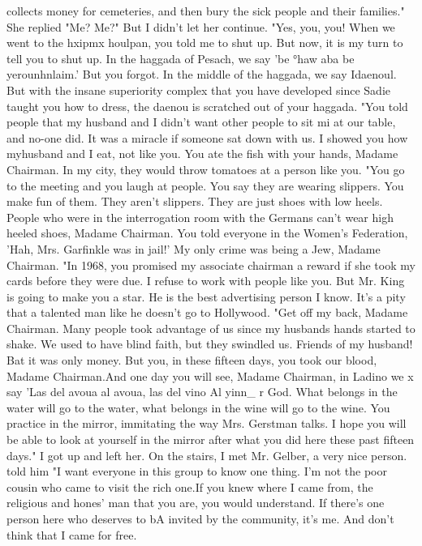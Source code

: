 {collects money for cemeteries, and then bury the sick people and their families."
She replied "Me?
Me?"
But I didn't let her continue.
"Yes, you, you!
When we went to the hxipmx houlpan, you told me to shut up.
But 
now, it is my turn to tell you to shut up.
In the haggada of Pesach, we say 'be 
°haw aba be yerounhnlaim.'
But you forgot.
In the middle of the haggada, we say 
Idaenoul.
But with the insane superiority complex that you have developed since Sadie 
taught you how to dress, the daenou is scratched out of your haggada.
"You told people that my husband and I didn't want other people to sit mi at our 
table, and no-one did.
It was a miracle if someone sat down with us.
I showed you 
how myhusband and I eat, not like you.
You ate the fish with your hands, Madame 
Chairman.
In my city, they would throw tomatoes at a person like you.
"You go to the meeting and you laugh at people.
You say they are wearing slippers.
You make fun of them.
They aren't slippers.
They are just shoes with low heels.
People who were in the interrogation room with the Germans can't wear high heeled shoes, 
Madame Chairman.
You told everyone in the Women's Federation, 'Hah, Mrs.
Garfinkle 
was in jail!'
My only crime was being a Jew, Madame Chairman.
"In 1968, you promised my associate chairman a reward if she took my cards before 
they were due.
I refuse to work with people like you.
But Mr.
King is going to make 
you a star.
He is the best advertising person I know.
It's a pity that a talented 
man like he doesn't go to Hollywood.
"Get off my back, Madame Chairman.
Many people took advantage of us since my 
husbands hands started to shake.
We used to have blind faith, but they swindled us.
Friends of my husband!
Bat it was only money.
But you, in these fifteen days, you 
took our blood, Madame Chairman.And one day you will see, Madame Chairman, in Ladino we x 
say 'Las del avoua al avoua, las del vino Al yinn_ r 
God.
What belongs in the water will go to the water, what belongs in the wine will go 
to the wine.
You practice in the mirror, immitating the way Mrs.
Gerstman talks.
I 
hope you will be able to look at yourself in the mirror after what you did here these 
past fifteen days."
I got up and left her.
On the stairs, I met Mr.
Gelber, a very nice person.
told him "I want everyone in this group to know one thing.
I'm not the poor cousin 
who came to visit the rich one.If you knew where I came from, the religious and hones' 
man that you are, you would understand.
If there's one person here who deserves to bA 
invited by the community, it's me.
And don't think that I came for free.
}
